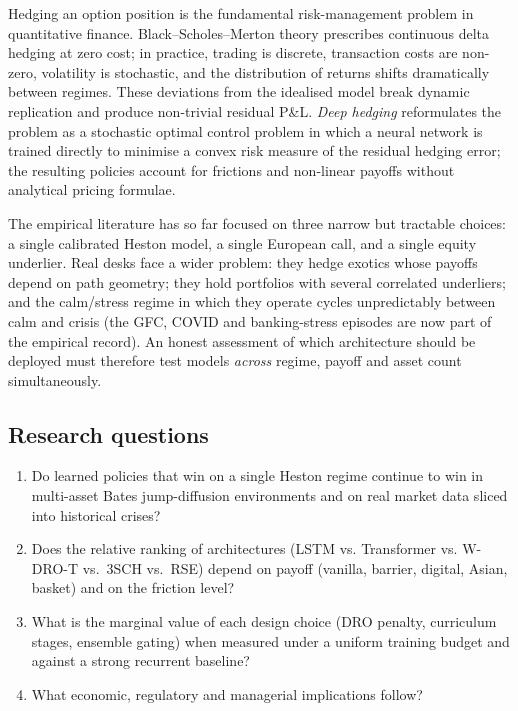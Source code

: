 \documentclass[11pt,a4paper]{article}
\begin{document}
Hedging an option position is the fundamental risk-management problem in
quantitative finance.  Black--Scholes--Merton theory \citep{black1973pricing,
merton1973theory} prescribes continuous delta hedging at zero cost; in practice,
trading is discrete, transaction costs are non-zero, volatility is
stochastic, and the distribution of returns shifts dramatically between
regimes.  These deviations from the idealised model break dynamic
replication and produce non-trivial residual P\&L.  \emph{Deep hedging}
\citep{buehler2019deep} reformulates the problem as a stochastic optimal
control problem in which a neural network is trained directly to minimise a
convex risk measure of the residual hedging error; the resulting policies
account for frictions and non-linear payoffs without analytical pricing
formulae.

The empirical literature has so far focused on three narrow but tractable
choices: a single calibrated Heston model, a single European call, and a
single equity underlier.  Real desks face a wider problem: they hedge
exotics whose payoffs depend on path geometry; they hold portfolios with
several correlated underliers; and the calm/stress regime in which they
operate cycles unpredictably between calm and crisis (the GFC, COVID and
banking-stress episodes are now part of the empirical record).  An
honest assessment of which architecture should be deployed must therefore
test models \emph{across} regime, payoff and asset count simultaneously.

\subsection{Research questions}

\begin{enumerate}[label=\textbf{Q\arabic*.},leftmargin=*]
\item Do learned policies that win on a single Heston regime continue to win
  in multi-asset Bates jump-diffusion environments and on real
  market data sliced into historical crises?
\item Does the relative ranking of architectures (LSTM vs. Transformer vs.
  W-DRO-T vs.\ 3SCH vs.\ RSE) depend on payoff (vanilla, barrier, digital,
  Asian, basket) and on the friction level?
\item What is the marginal value of each design choice (DRO penalty,
  curriculum stages, ensemble gating) when measured under a uniform
  training budget and against a strong recurrent baseline?
\item What economic, regulatory and managerial implications follow?
\end{enumerate}
\end{document}
